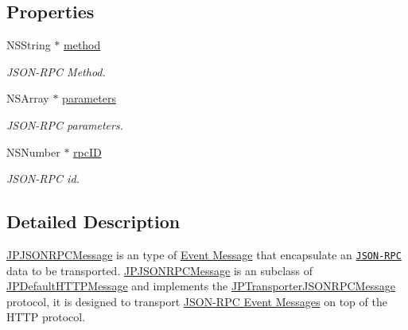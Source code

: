 \subsection*{Properties}
\begin{DoxyCompactItemize}
\item 
\hypertarget{a00018_ae58ae13d4aad4b95c2a7cb5aa304bcc2}{
NSString $\ast$ \hyperlink{a00018_ae58ae13d4aad4b95c2a7cb5aa304bcc2}{method}}
\label{a00018_ae58ae13d4aad4b95c2a7cb5aa304bcc2}

\begin{DoxyCompactList}\small\item\em JSON-\/RPC Method. \item\end{DoxyCompactList}\item 
\hypertarget{a00018_a0da3510d87d44b6ead2d16aac67e6247}{
NSArray $\ast$ \hyperlink{a00018_a0da3510d87d44b6ead2d16aac67e6247}{parameters}}
\label{a00018_a0da3510d87d44b6ead2d16aac67e6247}

\begin{DoxyCompactList}\small\item\em JSON-\/RPC parameters. \item\end{DoxyCompactList}\item 
\hypertarget{a00018_afc35a8f75460f6d18f74cc5860b2df1b}{
NSNumber $\ast$ \hyperlink{a00018_afc35a8f75460f6d18f74cc5860b2df1b}{rpcID}}
\label{a00018_afc35a8f75460f6d18f74cc5860b2df1b}

\begin{DoxyCompactList}\small\item\em JSON-\/RPC id. \item\end{DoxyCompactList}\end{DoxyCompactItemize}


\subsection{Detailed Description}
\hyperlink{a00018}{JPJSONRPCMessage} is an type of \hyperlink{a00006}{Event Message} that encapsulate an \href{http://en.wikipedia.org/wiki/JSON-RPC}{\tt JSON-\/RPC} data to be transported. \hyperlink{a00018}{JPJSONRPCMessage} is an subclass of \hyperlink{a00012}{JPDefaultHTTPMessage} and implements the \hyperlink{a00041}{JPTransporterJSONRPCMessage} protocol, it is designed to transport \hyperlink{a00008}{JSON-\/RPC Event Messages} on top of the HTTP protocol. 


